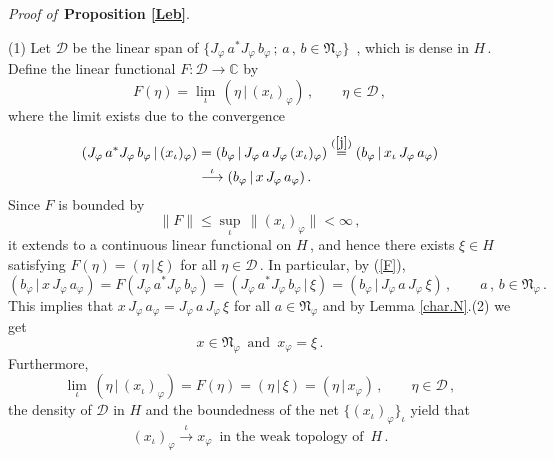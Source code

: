 \documentclass[reqno]{amsart}
\theoremstyle{definition}
\theoremstyle{remark}
\numberwithin{equation}{section}
\theoremstyle{plain}
\begin{document}
\medskip

{\it Proof of }$\,${\bf Proposition \ref{Leb}}.
\medskip

(1) Let $\mathcal D$ be the linear span of $\{ J_\varphi\, a^*
J_\varphi\, b_\varphi\, ;\, a\, ,\, b\in\mathfrak N_\varphi\}\,$
, which is dense in $H\,$. Define the linear functional
$F : \mathcal D \longrightarrow \mathbb C$ by
\begin{equation*}
F(\eta )=\lim_\iota\, (\eta\, |\, (x_\iota )_\varphi )\, ,\qquad
\eta\in\mathcal D\, ,
\end{equation*}
where the limit exists due to the convergence
\begin{equation}\label{F}
\begin{split}
(J_\varphi\, a^* J_\varphi\, b_\varphi\, |\, (x_\iota )_\varphi )
&=(b_\varphi\, |\, J_\varphi\, a\, J_\varphi\, (x_\iota )_\varphi )
\overset{(\ref{j})}{=} (b_\varphi\, |\, x_\iota\, J_\varphi\,
a_\varphi ) \\
&\overset{\iota}{\longrightarrow}
(b_\varphi\, |\, x\, J_\varphi\, a_\varphi )\, .
\end{split}
\end{equation}
Since $F$ is bounded by
\begin{equation*}
\| F\|\leq \sup_\iota\, \| (x_\iota )_\varphi\|<\infty\, ,
\end{equation*}
it extends to a continuous linear functional on $H\,$, and hence
there exists $\xi\in H$ satisfying $F(\eta ) =(\eta\, |\,\xi )$
for all $\eta\in\mathcal D\,$. In particular, by (\ref{F}),
\begin{equation*}
(b_\varphi\, |\, x\, J_\varphi\, a_\varphi ) =
F( J_\varphi\, a^* J_\varphi\, b_\varphi ) =
(J_\varphi\, a^* J_\varphi\, b_\varphi\, |\,\xi ) =
(b_\varphi\, |\, J_\varphi\, a\, J_\varphi\,\xi )\, ,\qquad
a\, ,\, b\in\mathfrak N_\varphi\, .
\end{equation*}
This implies that $x\, J_\varphi\, a_\varphi =J_\varphi\, a\,
J_\varphi\,\xi$ for all $a\in\mathfrak N_\varphi$ and by
Lemma \ref{char.N}.(2) we get
\begin{equation*}
x\in\mathfrak N_\varphi\,\text{ and }\, x_\varphi =\xi\, .
\end{equation*}
Furthermore,
\begin{equation*}
\lim_\iota\, (\eta\, |\, (x_\iota )_\varphi ) =F(\eta ) =(\eta\,
|\,\xi )=(\eta\, |\, x_\varphi )\, ,\qquad\eta\in\mathcal D\, ,
\end{equation*}
the density of $\mathcal D$ in $H$ and the boundedness of the net
$\{ (x_\iota )_\varphi\}_\iota$ yield that
\begin{equation*}
(x_\iota )_\varphi \overset{\iota}{\longrightarrow} x_\varphi\,
\text{ in the weak topology of }\, H\, .
\end{equation*}
\end{document}
